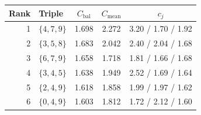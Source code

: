 \begin{tabular}{rlccc}
\toprule
Rank & Triple & $C_{\mathrm{bal}}$ & $C_{\mathrm{mean}}$ & $c_j$ \\
\midrule
1 & $\{4,7,9\}$ & 1.698 & 2.272 & 3.20 / 1.70 / 1.92 \\
2 & $\{3,5,8\}$ & 1.683 & 2.042 & 2.40 / 2.04 / 1.68 \\
3 & $\{6,7,9\}$ & 1.658 & 1.718 & 1.81 / 1.66 / 1.68 \\
4 & $\{3,4,5\}$ & 1.638 & 1.949 & 2.52 / 1.69 / 1.64 \\
5 & $\{2,4,9\}$ & 1.618 & 1.858 & 1.99 / 1.97 / 1.62 \\
6 & $\{0,4,9\}$ & 1.603 & 1.812 & 1.72 / 2.12 / 1.60 \\
\bottomrule
\end{tabular}
